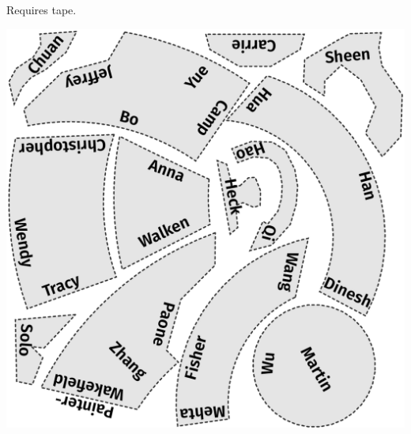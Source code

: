\documentclass{puzz}
\begin{document}
\vspace{-2ex}
\begin{center}
Requires tape.

\includegraphics[width=\columnwidth]{teatime/teapot.pdf}
\end{center}
\end{document}

